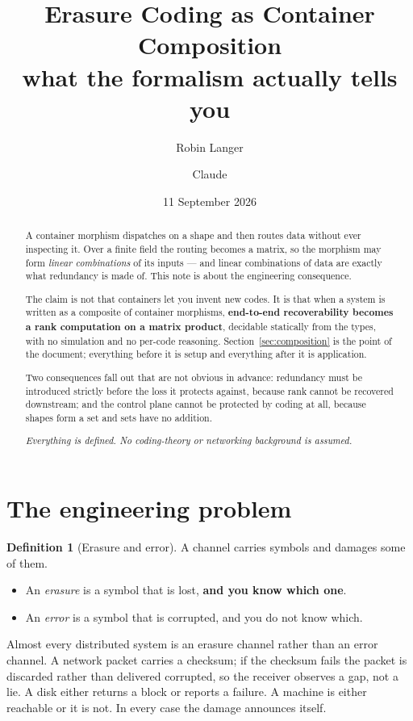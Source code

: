 \documentclass[11pt,a4paper]{article}
\title{\bfseries Erasure Coding as Container Composition\\[0.4em]
\large what the formalism actually tells you}
\author{Robin Langer \and Claude}
\date{11 September 2026}
\theoremstyle{definition}
\newtheorem{definition}[theorem]{Definition}
\theoremstyle{remark}
\begin{document}
\maketitle

\begin{abstract}
A container morphism dispatches on a shape and then routes data without ever
inspecting it. Over a finite field the routing becomes a matrix, so the morphism may
form \emph{linear combinations} of its inputs --- and linear combinations of data are
exactly what redundancy is made of. This note is about the engineering consequence.

The claim is not that containers let you invent new codes. It is that when a system
is written as a composite of container morphisms, \textbf{end-to-end recoverability
becomes a rank computation on a matrix product}, decidable statically from the types,
with no simulation and no per-code reasoning. Section~\ref{sec:composition} is the
point of the document; everything before it is setup and everything after it is
application.

Two consequences fall out that are not obvious in advance: redundancy must be
introduced strictly before the loss it protects against, because rank cannot be
recovered downstream; and the control plane cannot be protected by coding at all,
because shapes form a set and sets have no addition.

\medskip
\noindent\emph{Everything is defined. No coding-theory or networking background is
assumed.}
\end{abstract}

\tableofcontents

\section{The engineering problem}

\begin{definition}[Erasure and error]
A channel carries symbols and damages some of them.
\begin{itemize}[nosep]
  \item An \emph{erasure} is a symbol that is lost, \textbf{and you know which one}.
  \item An \emph{error} is a symbol that is corrupted, and you do not know which.
\end{itemize}
\end{definition}

Almost every distributed system is an erasure channel rather than an error channel.
A network packet carries a checksum; if the checksum fails the packet is discarded
rather than delivered corrupted, so the receiver observes a gap, not a lie. A disk
either returns a block or reports a failure. A machine is either reachable or it is
not. In every case the damage announces itself.
\end{document}
